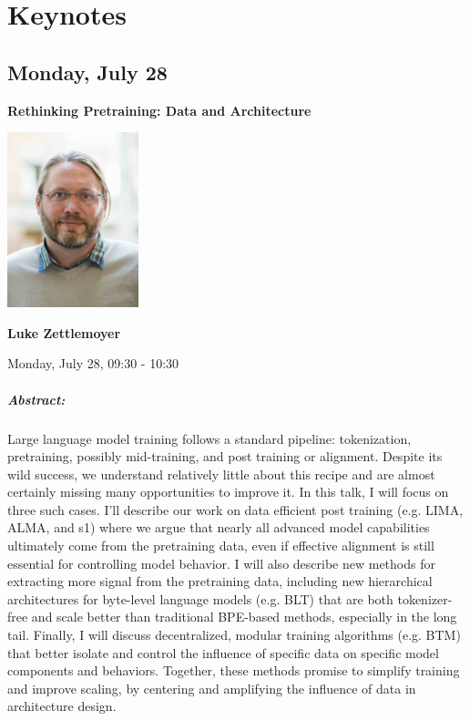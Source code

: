 \chapter[Keynotes]{Keynotes}

\section{Monday, July 28}


\begin{center}
    {\Large \textbf{Rethinking Pretraining: Data and Architecture}}
    
    \includegraphics[width=1.5in]{luke.jpg}
    
    {\large \textbf{Luke Zettlemoyer}}

    Monday, July 28, 09:30 - 10:30
\end{center}

\paragraph{Abstract:}
Large language model training follows a standard pipeline: tokenization, pretraining, possibly mid-training, and post training or alignment. Despite its wild success, we understand relatively little about this recipe and are almost certainly missing many opportunities to improve it. In this talk, I will focus on three such cases. I’ll describe our work on data efficient post training (e.g. LIMA, ALMA, and s1) where we argue that nearly all advanced model capabilities ultimately come from the pretraining data, even if effective alignment is still essential for controlling model behavior. I will also describe new methods for extracting more signal from the pretraining data, including new hierarchical architectures for byte-level language models (e.g. BLT) that are both tokenizer-free and scale better than traditional BPE-based methods, especially in the long tail. Finally, I will discuss decentralized, modular training algorithms (e.g. BTM) that better isolate and control the influence of specific data on specific model components and behaviors. Together, these methods promise to simplify training and improve scaling, by centering and amplifying the influence of data in architecture design. 

